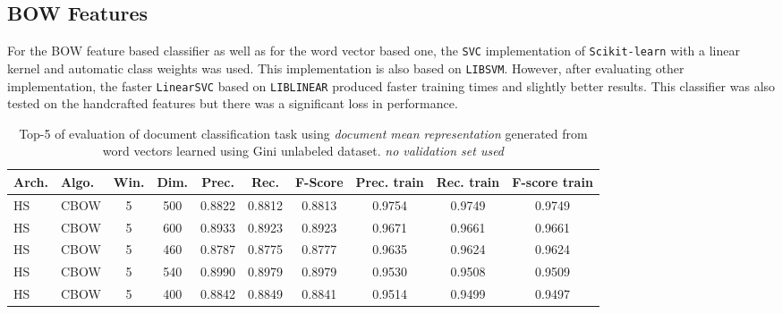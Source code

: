 \subsection{\ac{BOW} Features}

For the \ac{BOW} feature based classifier as well as for the word vector
based one, the  \texttt{SVC} implementation of  \texttt{Scikit-learn}
with a linear kernel and automatic class weights was used. This
implementation is also  based on \texttt{LIBSVM}. However, after evaluating
other implementation, the  faster \texttt{LinearSVC} based on \texttt{LIBLINEAR}
\cite{Fan:2008:LLL:1390681.1442794}  produced faster training times
and slightly better results. This classifier was also tested on the
handcrafted features but there was a significant loss in performance.


\begin{table}[!htbp] 

  \centering
  \caption{Top-5 of evaluation of document classification task using
    \textit{document mean representation} generated from word vectors learned
  using Gini unlabeled dataset. \textit{no validation set used}
 }
  \label{tab:w2v4tc_ginig_w2v_evaluation_no_validation}

\small
\begin{tabular}{|llcc|ccc|ccc|}
\hline
 Arch.  &  Algo.  &  Win.  &  Dim.  &  Prec.  &  Rec.  &  F-Score  &  Prec.
 train  &  Rec. train  &  F-score train  \\
\hline
 \ac{HS}       &  \ac{CBOW}  &       5  &   500  &     0.8822  &  0.8812  &    0.8813  &        0.9754  &       0.9749  &          0.9749  \\
 \ac{HS}       &  \ac{CBOW}  &       5  &   600  &     0.8933  &  0.8923  &    0.8923  &        0.9671  &       0.9661  &          0.9661  \\
 \ac{HS}       &  \ac{CBOW}  &       5  &   460  &     0.8787  &  0.8775  &    0.8777  &        0.9635  &       0.9624  &          0.9624  \\
 \ac{HS}       &  \ac{CBOW}  &       5  &   540  &     0.8990  &  0.8979  &    0.8979  &        0.9530  &       0.9508  &          0.9509  \\
 \ac{HS}       &  \ac{CBOW}  &       5  &   400  &     0.8842  &  0.8849  &
 0.8841  &        0.9514  &       0.9499  &          0.9497  \\
\hline
\end{tabular}
\end{table}



